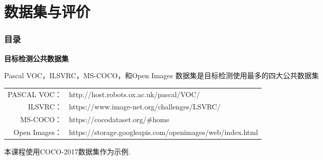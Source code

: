 \section{数据集与评价}
\begin{frame}[allowframebreaks]
    \frametitle{\textsc{目录}} \vspace{-0.3cm}
    \begin{spacing}{0.0}
    \end{spacing}   %
\end{frame}

\begin{frame}
    \noindent\large\textbf{目标检测公共数据集}\\
    \vspace{1em}

    Pascal VOC，ILSVRC，MS-COCO，和Open Images 数据集是目标检测使用最多的四大公共数据集
    \vspace{2em}
    \begin{tabular}{rl}
        \small{PASCAL VOC}：  & \small{http://host.robots.ox.ac.uk/pascal/VOC/}                  \\
        \small{ILSVRC}：      & \small{https://www.image-net.org/challenges/LSVRC/}              \\
        \small{MS-COCO}：     & \small{https://cocodataset.org/\#home}                           \\
        \small{Open Images}： & \small{https://storage.googleapis.com/openimages/web/index.html} \\
    \end{tabular}
    \vspace{2em}
    本课程使用COCO-2017数据集作为示例.
\end{frame}

